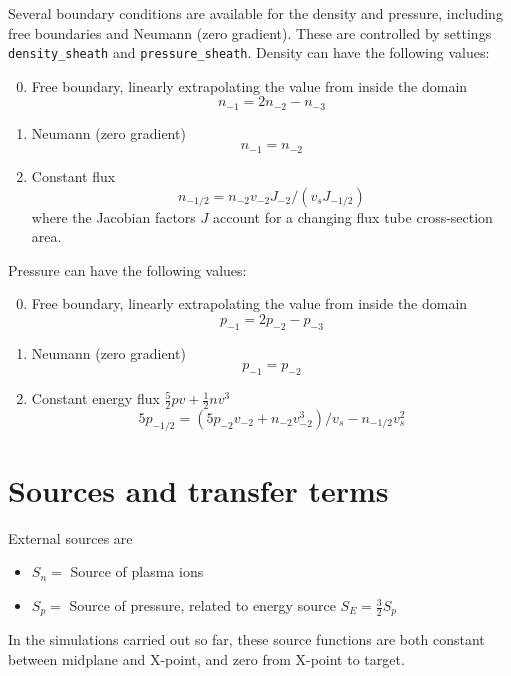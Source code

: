 \documentclass[12pt,a4paper]{article}
\begin{document}
Several boundary conditions are available for the density and pressure, including free boundaries
and Neumann (zero gradient). These are controlled by settings \texttt{density\_sheath} and \texttt{pressure\_sheath}.
Density can have the following values:
\begin{enumerate}
\setcounter{enumi}{-1}
\item Free boundary, linearly extrapolating the value from
  inside the domain
  \begin{equation}
    n_{-1} = 2n_{-2} - n_{-3}
  \end{equation}
\item Neumann (zero gradient)
  \begin{equation}
    n_{-1} = n_{-2}
  \end{equation}
\item Constant flux
  \begin{equation}
    n_{-1/2} = n_{-2}v_{-2}J_{-2} / \left( v_s J_{-1/2} \right)
  \end{equation}
  where the Jacobian factors $J$ account for a changing flux tube cross-section area.
\end{enumerate}
Pressure can have the following values:
\begin{enumerate}
\setcounter{enumi}{-1}
\item Free boundary, linearly extrapolating the value from
  inside the domain
  \begin{equation}
    p_{-1} = 2p_{-2} - p_{-3}
  \end{equation}
\item Neumann (zero gradient)
  \begin{equation}
    p_{-1} = p_{-2}
  \end{equation}
\item Constant energy flux $\frac{5}{2}pv + \frac{1}{2}nv^3$
  \begin{equation}
   5 p_{-1/2} = \left( 5p_{-2}v_{-2} + n_{-2}v_{-2}^3\right) / v_s - n_{-1/2}v_s^2
  \end{equation}
\end{enumerate}

\section{Sources and transfer terms}

External sources are
\begin{itemize}
\item $S_n = $ Source of plasma ions
\item $S_p = $ Source of pressure, related to energy source $S_E = \frac{3}{2}S_p$
\end{itemize}
In the simulations carried out so far, these source functions are both constant between midplane and X-point, and zero
from X-point to target.
\end{document}
